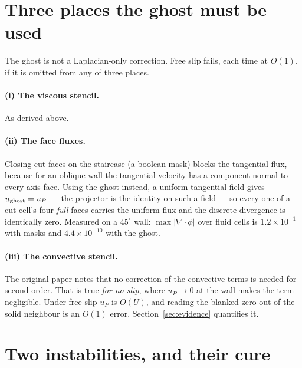 \documentclass[11pt,a4paper]{article}
\begin{document}
\section{Three places the ghost must be used}

The ghost is not a Laplacian-only correction. Free slip fails, each time at $O(1)$, if it is
omitted from any of three places.

\paragraph{(i) The viscous stencil.} As derived above.

\paragraph{(ii) The face fluxes.} Closing cut faces on the staircase (a boolean mask) blocks
the tangential flux, because for an oblique wall the tangential velocity has a component
normal to every axis face. Using the ghost instead, a uniform tangential field gives
$u_{\rm ghost}=u_P$ --- the projector is the identity on such a field --- so every one of a
cut cell's four \emph{full} faces carries the uniform flux and the discrete divergence is
identically zero. Measured on a $45^\circ$ wall: $\max|\nabla\!\cdot\!\phi|$ over fluid cells
is $1.2\times10^{-1}$ with masks and $4.4\times10^{-10}$ with the ghost.

\paragraph{(iii) The convective stencil.} The original paper notes that no correction of the
convective terms is needed for second order. That is true \emph{for no slip}, where $u_P\to0$
at the wall makes the term negligible. Under free slip $u_P$ is $O(U)$, and reading the
blanked zero out of the solid neighbour is an $O(1)$ error. Section~\ref{sec:evidence}
quantifies it.

\section{Two instabilities, and their cure}
\end{document}
